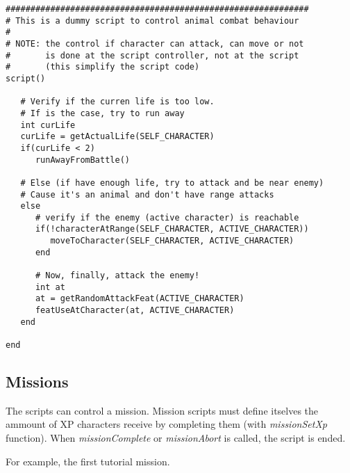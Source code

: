 \documentclass[ letterpaper,12pt]{article}
\begin{document}
\begin{verbatim}
#############################################################
# This is a dummy script to control animal combat behaviour
#
# NOTE: the control if character can attack, can move or not
#       is done at the script controller, not at the script
#       (this simplify the script code)
script()

   # Verify if the curren life is too low.
   # If is the case, try to run away
   int curLife
   curLife = getActualLife(SELF_CHARACTER)
   if(curLife < 2)
      runAwayFromBattle()

   # Else (if have enough life, try to attack and be near enemy)
   # Cause it's an animal and don't have range attacks
   else
      # verify if the enemy (active character) is reachable
      if(!characterAtRange(SELF_CHARACTER, ACTIVE_CHARACTER))
         moveToCharacter(SELF_CHARACTER, ACTIVE_CHARACTER)
      end

      # Now, finally, attack the enemy!
      int at
      at = getRandomAttackFeat(ACTIVE_CHARACTER)
      featUseAtCharacter(at, ACTIVE_CHARACTER)
   end

end
\end{verbatim}

\subsection{Missions}

The scripts can control a mission. Mission scripts must define itselves the
ammount of XP characters receive by completing them (with {\it missionSetXp}
function). When {\it missionComplete} or {\it missionAbort} is called, the
script is ended. 

For example, the first tutorial mission.
\end{document}
